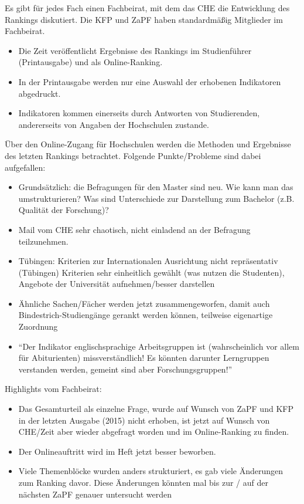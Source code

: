       Es gibt für jedes Fach einen Fachbeirat, mit dem das CHE die Entwicklung des Rankings diskutiert. Die KFP und ZaPF haben standardmäßig Mitglieder im Fachbeirat.
      \begin{itemize}
        \item Die Zeit veröffentlicht Ergebnisse des Rankings im Studienführer (Printausgabe) und als Online-Ranking.
        \item In der Printausgabe werden nur eine Auswahl der erhobenen Indikatoren abgedruckt.
        \item Indikatoren kommen einerseits durch Antworten von Studierenden, andererseits von Angaben der Hochschulen zustande.
      \end{itemize}

      Über den Online-Zugang für Hochschulen werden die Methoden und Ergebnisse des letzten Rankings betrachtet. Folgende Punkte/Probleme sind dabei aufgefallen:
      \begin{itemize}
        \item Grundsätzlich: die Befragungen für den Master sind neu. Wie kann man das umstrukturieren? Was sind Unterschiede zur Darstellung zum Bachelor (z.B. Qualität der Forschung)?
        \item Mail vom CHE sehr chaotisch, nicht einladend an der Befragung teilzunehmen.
        \item Tübingen: Kriterien zur Internationalen Ausrichtung nicht repräsentativ (Tübingen) Kriterien sehr einheitlich gewählt (was nutzen die Studenten), Angebote der Universität aufnehmen/besser darstellen
        \item Ähnliche Sachen/Fächer werden jetzt zusammengeworfen, damit auch Bindestrich-Studiengänge gerankt werden können, teilweise eigenartige Zuordnung
        \item ``Der Indikator englischsprachige Arbeitsgruppen ist (wahrscheinlich vor allem für Abiturienten) missverständlich! Es könnten darunter Lerngruppen verstanden werden, gemeint sind aber Forschungsgruppen!''

      \end{itemize}

      Highlights vom Fachbeirat:
      \begin{itemize}
        \item Das Gesamturteil als einzelne Frage, wurde auf Wunsch von ZaPF und KFP in der letzten Ausgabe (2015) nicht erhoben, ist jetzt auf Wunsch von CHE/Zeit aber wieder abgefragt worden und im Online-Ranking zu finden.
        \item Der Onlineauftritt wird im Heft jetzt besser beworben.
        \item Viele Themenblöcke wurden anders strukturiert, es gab viele Änderungen zum Ranking davor. Diese Änderungen könnten mal bis zur / auf der nächsten ZaPF genauer untersucht werden
      \end{itemize}

